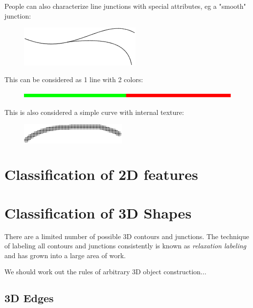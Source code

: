 People can also characterize line junctions with special attributes, eg a "smooth" junction:

\begin{figure}[H]
\centering
\includegraphics[scale=0.7, bb=0 0 228 78]{Line8.PNG}
\end{figure}

This can be considered as  1 line with 2 colors:

\begin{figure}[H]
\centering
\includegraphics[scale=0.7, bb=0 0 248 6]{Line9.eps}
\end{figure}

This is also considered a simple curve with internal texture:

\begin{figure}[H]
\centering
\includegraphics[scale=0.7, bb=0 0 200 40]{Line10.PNG}
\end{figure}

\underconst

\section{Classification of 2D features}

\underconst

\section{Classification of 3D Shapes}

There are a limited number of possible 3D contours and junctions. The technique of labeling all contours and junctions consistently is known as \emph{relaxation labeling} and has grown into a large area of work.

We should work out the rules of arbitrary 3D object construction...

\underconst

\subsection{3D Edges}

